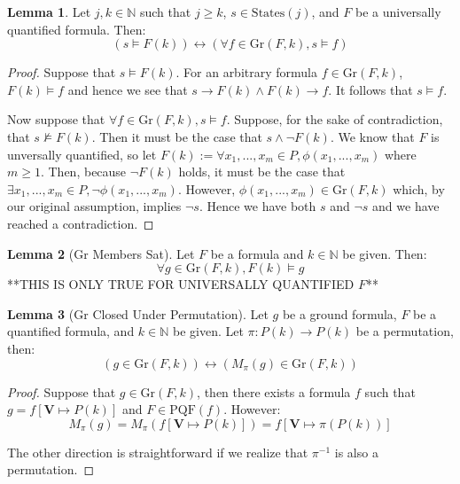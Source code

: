 \documentclass[12pt]{article}
\theoremstyle{definition}
\newtheorem{lemma}{Lemma}
\theoremstyle{remark}
\newcommand{\msp}{\text{ }}
\newcommand{\states}{\text{States}}
\newcommand{\gr}{\text{Gr}}
\newcommand{\PQF}{\text{PQF}}
\begin{document}
\begin{lemma}
  \label{lem:pnf-ground}
  Let $j,k \in \mathbb{N}$ such that $j \geq k$, $s \in \states(j)$, and $F$ be a universally quantified formula.  Then:
  $$(s \models F(k)) \leftrightarrow (\forall f \in \gr(F,k), s \models f)$$
\end{lemma}
\begin{proof}
  Suppose that $s \models F(k)$.  For an arbitrary formula $f \in \gr(F,k)$, $F(k) \models f$ and hence we see that $s \rightarrow F(k) \land F(k) \rightarrow f$.  It follows that $s \models f$.

  Now suppose that $\forall f \in \gr(F,k), s \models f$.  Suppose, for the sake of contradiction, that $s \not\models F(k)$.  Then it must be the case that $s \land \neg F(k)$.  We know that $F$ is unversally quantified, so let $F(k) := \forall x_1,...,x_m \in P, \phi(x_1,...,x_m)$ where $m \geq 1$.  Then, because $\neg F(k)$ holds, it must be the case that $\exists x_1,...,x_m \in P, \neg \phi(x_1,...,x_m)$.  However, $\phi(x_1,...,x_m) \in \gr(F,k)$ which, by our original assumption, implies $\neg s$.  Hence we have both $s$ and $\neg s$ and we have reached a contradiction.
\end{proof}

\begin{lemma}[Gr Members Sat]
  \label{lem:gr-sat}
  Let $F$ be a formula and $k \in \mathbb{N}$ be given.  Then:
  $$\forall g \in \gr(F,k), F(k) \models g$$
  **THIS IS ONLY TRUE FOR UNIVERSALLY QUANTIFIED $F$**
\end{lemma}

\begin{lemma}[Gr Closed Under Permutation]
  \label{lem:gr-closed}
  Let $g$ be a ground formula, $F$ be a quantified formula, and $k \in \mathbb{N}$ be given.  Let $\pi : P(k) \to P(k)$ be a permutation, then:
  $$(g \in \gr(F,k)) \leftrightarrow (M_\pi(g) \in \gr(F,k))$$
\end{lemma}
\begin{proof}
  Suppose that $g \in \gr(F,k)$, then there exists a formula $f$ such that $g = f[\mathbf{V} \mapsto P(k)]$ and $F \in \PQF(f)$.  However:
  $$M_\pi(g) = M_\pi(f[\mathbf{V} \mapsto P(k)]) = f[\mathbf{V} \mapsto \pi(P(k))]$$

  The other direction is straightforward if we realize that $\pi^{-1}$ is also a permutation.
\end{proof}
\end{document}
